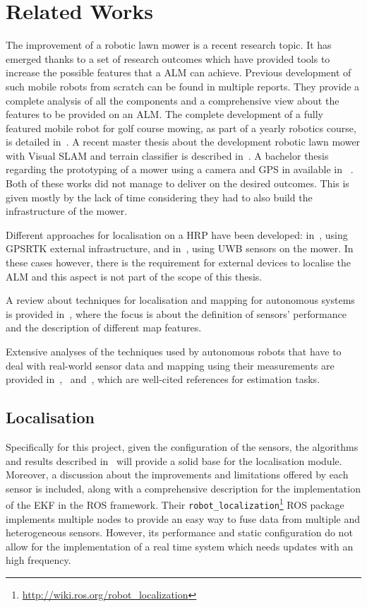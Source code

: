 \section{Related Works}

\noindent
The improvement of a robotic lawn mower is a recent research topic. It has emerged thanks to a set of research outcomes which have provided tools to increase the possible features that a \gls{ALM} can achieve.
Previous development of such mobile robots from scratch can be found in multiple reports.
They provide a complete analysis of all the components and a comprehensive view about the features to be provided on an \gls{ALM}.
The complete development of a fully featured mobile robot for golf course mowing, as part of a yearly robotics course, is detailed in~\cite{noauthor_groundsbot_nodate}.
A recent master thesis about the development robotic lawn mower with Visual SLAM and terrain classifier is described in~\cite{lukas_robotic_2020}.
A bachelor thesis regarding the prototyping of a mower using a camera and GPS in available in~ \cite{andersson_smart_2018}.
Both of these works did not manage to deliver on the desired outcomes. This is given mostly by the lack of time considering they had to also build the infrastructure of the mower.

Different approaches for localisation on a \gls{HRP} have been developed: in~\cite{oden_localization_2017}, using \gls{GPSRTK} external infrastructure, and in~\cite{lensund_local_2018}, using \gls{UWB} sensors on the mower.
In these cases however, there is the requirement for external devices to localise the \gls{ALM} and this aspect is not part of the scope of this thesis.


A review about techniques for localisation and mapping for autonomous systems is provided in~\cite{9065135}, where the focus is about the definition of sensors' performance and the description of different map features.

Extensive analyses of the techniques used by autonomous robots that have to deal with real-world sensor data and mapping using their measurements are provided in~\cite{thrun_probabilistic_2005},~\cite{gustafsson_statistical_2010} and~\cite{mitchell2007multi}, which are well-cited references for estimation tasks.

\subsection{Localisation}

Specifically for this project, given the configuration of the sensors, the algorithms and results described in~\cite{moore_generalized_2016} will provide a solid base for the localisation module.
Moreover, a discussion about the improvements and limitations offered by each sensor is included, along with a comprehensive description for the implementation of the \gls{EKF} in the \gls{ROS} framework.
Their \texttt{robot\_localization}\footnote{\url{http://wiki.ros.org/robot_localization}} ROS package implements multiple nodes to provide an easy way to fuse data from multiple and heterogeneous sensors.
However, its performance and static configuration do not allow for the implementation of a real time system which needs updates with an high frequency.

